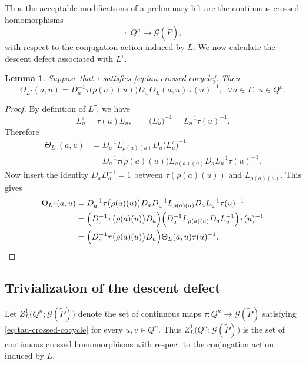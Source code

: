\documentclass[11pt,a4paper]{article}
\numberwithin{equation}{section}
\newtheorem{lemma}[definition]{Lemma}
\theoremstyle{named}
\begin{document}
Thus the acceptable modifications of a preliminary lift are the continuous crossed homomorphisms 
\[
\tau:Q^n\longrightarrow\mathcal G(\widetilde P),
\]
with respect to the conjugation action induced by \(L\). We now calculate the descent defect associated with \(L^\tau\).

\begin{lemma}
\label{lem:defect-transformation}
Suppose that \(\tau\) satisfies
\eqref{eq:tau-crossed-cocycle}. Then
\begin{equation}
\label{eq:defect-transformation}
\Theta_{L^\tau}(a,u)
=
D_a^{-1}\tau\bigl(\rho(a)(u)\bigr)D_a\,
\Theta_L(a,u)\,
\tau(u)^{-1},\;\;\forall a\in\Gamma,\;u\in Q^n.
\end{equation}

\end{lemma}

\begin{proof}
By definition of \(L^\tau\), we have
\[
L^\tau_u=\tau(u)L_u,
\qquad
\bigl(L^\tau_u\bigr)^{-1}
=
L_u^{-1}\tau(u)^{-1}.
\]
Therefore
\begin{align*}
\Theta_{L^\tau}(a,u)
&=
D_a^{-1}
L^\tau_{\rho(a)(u)}
D_a
\bigl(L^\tau_u\bigr)^{-1}
\\
&=
D_a^{-1}
\tau\bigl(\rho(a)(u)\bigr)
L_{\rho(a)(u)}
D_a
L_u^{-1}
\tau(u)^{-1}.
\end{align*}
Now insert the identity
$D_aD_a^{-1}=1$
between \(\tau(\rho(a)(u))\) and \(L_{\rho(a)(u)}\). This gives
\begin{align*}
\Theta_{L^\tau}(a,u)
&=
D_a^{-1}
\tau\bigl(\rho(a)(u)\bigr)
D_a
D_a^{-1}
L_{\rho(a)(u)}
D_a
L_u^{-1}
\tau(u)^{-1}
\\
&=
\Bigl(
D_a^{-1}
\tau\bigl(\rho(a)(u)\bigr)
D_a
\Bigr)
\Bigl(
D_a^{-1}
L_{\rho(a)(u)}
D_a
L_u^{-1}
\Bigr)
\tau(u)^{-1}
\\
&=
\Bigl(
D_a^{-1}
\tau\bigl(\rho(a)(u)\bigr)
D_a
\Bigr)
\Theta_L(a,u)
\tau(u)^{-1}.
\end{align*}
\end{proof}

\subsection{Trivialization of the descent defect}

Let $Z_L^1\bigl(Q^n;\mathcal G(\widetilde P)\bigr)$
denote the set of continuous maps $\tau:Q^n\longrightarrow\mathcal G(\widetilde P)$
satisfying
\eqref{eq:tau-crossed-cocycle}
for every \(u,v\in Q^n\). Thus
$Z_L^1\bigl(Q^n;\mathcal G(\widetilde P)\bigr)$
is the set of continuous crossed homomorphisms with respect to the conjugation action induced by \(L\).
\end{document}
